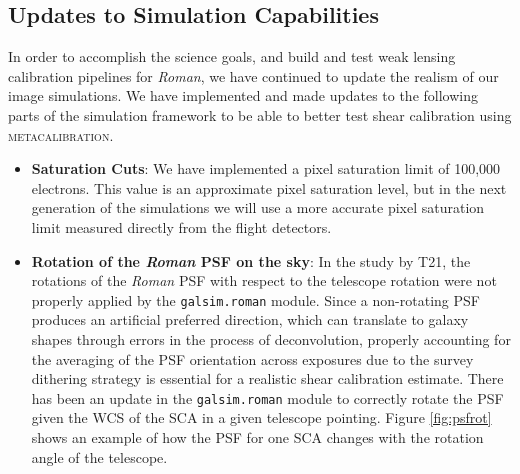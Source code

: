\documentclass[fleqn,usenatbib]{mnras}
\begin{document}
\subsection{Updates to Simulation Capabilities}
\label{subsec:updates}
In order to accomplish the science goals, and build and test weak lensing calibration pipelines for \emph{Roman}, we have continued to update the realism of our image simulations. We have implemented and made updates to the following parts of the simulation framework to be able to better test shear calibration using \textsc{metacalibration}. 
\begin{itemize}
    \setlength\itemsep{1em}
    \item \textbf{Saturation Cuts}:
    We have implemented a pixel saturation limit of 100,000 electrons. This value is an approximate pixel saturation level, but in the next generation of the simulations we will use a more accurate pixel saturation limit measured directly from the flight detectors. 
    
    \item \textbf{Rotation of the \emph{Roman} PSF on the sky}:
    In the study by T21, the rotations of the \emph{Roman} PSF with respect to the telescope rotation were not properly applied by the \texttt{galsim.roman} module. Since a non-rotating PSF produces an artificial preferred direction, which can translate to galaxy shapes through errors in the process of deconvolution, properly accounting for the averaging of the PSF orientation across exposures due to the survey dithering strategy is essential for a realistic shear calibration estimate. There has been an update in the \texttt{galsim.roman} module to correctly rotate the PSF given the WCS of the SCA in a given telescope pointing. Figure \ref{fig:psfrot} shows an example of how the PSF for one SCA changes with the rotation angle of the telescope.
    

\end{itemize}
\end{document}
